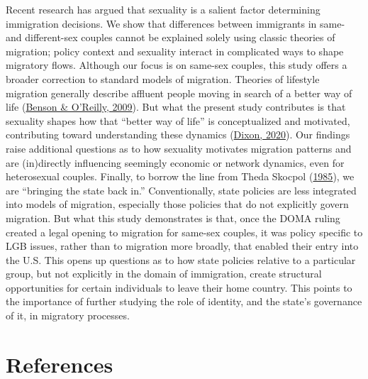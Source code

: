 \documentclass[
  12pt,
]{article}
\begin{document}
Recent research has argued that sexuality is a salient factor determining immigration decisions. We show that differences between immigrants in same- and different-sex couples cannot be explained solely using classic theories of migration; policy context and sexuality interact in complicated ways to shape migratory flows. Although our focus is on same-sex couples, this study offers a broader correction to standard models of migration. Theories of lifestyle migration generally describe affluent people moving in search of a better way of life (\protect\hyperlink{ref-benson_2009}{Benson \& O'Reilly, 2009}). But what the present study contributes is that sexuality shapes how that ``better way of life'' is conceptualized and motivated, contributing toward understanding these dynamics (\protect\hyperlink{ref-dixon_2020}{Dixon, 2020}). Our findings raise additional questions as to how sexuality motivates migration patterns and are (in)directly influencing seemingly economic or network dynamics, even for heterosexual couples. Finally, to borrow the line from Theda Skocpol (\protect\hyperlink{ref-skocpol_1985}{1985}), we are ``bringing the state back in.'' Conventionally, state policies are less integrated into models of migration, especially those policies that do not explicitly govern migration. But what this study demonstrates is that, once the DOMA ruling created a legal opening to migration for same-sex couples, it was policy specific to LGB issues, rather than to migration more broadly, that enabled their entry into the U.S. This opens up questions as to how state policies relative to a particular group, but not explicitly in the domain of immigration, create structural opportunities for certain individuals to leave their home country. This points to the importance of further studying the role of identity, and the state's governance of it, in migratory processes.

\hypertarget{references}{%
\section{References}\label{references}}

\setlength{\parindent}{-0.2in}
\setlength{\leftskip}{0.2in}
\setlength{\parskip}{8pt}

\noindent
\end{document}

